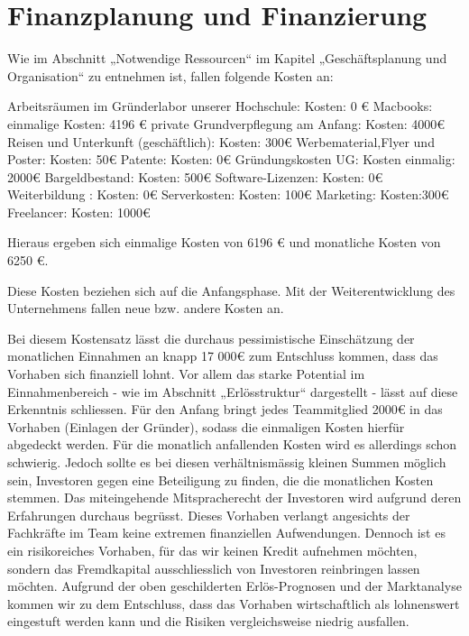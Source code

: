 \chapter{Finanzplanung und Finanzierung}

Wie im Abschnitt „Notwendige Ressourcen“ im Kapitel „Geschäftsplanung und Organisation“ zu entnehmen ist, fallen folgende Kosten an:


Arbeitsräumen im Gründerlabor unserer Hochschule: Kosten: 0 €
Macbooks: einmalige Kosten:  4196 €
private Grundverpflegung am Anfang:  Kosten: 4000€
Reisen und Unterkunft  (geschäftlich):  Kosten: 300€
Werbematerial,Flyer und Poster: Kosten: 50€
Patente: Kosten: 0€
Gründungskosten UG: Kosten einmalig: 2000€
Bargeldbestand: Kosten: 500€
Software-Lizenzen: Kosten: 0€
Weiterbildung : Kosten: 0€
Serverkosten: Kosten: 100€
Marketing: Kosten:300€
Freelancer: Kosten: 1000€

Hieraus ergeben sich einmalige Kosten von 6196 € und monatliche Kosten von 6250 €.

Diese Kosten beziehen sich auf die Anfangsphase. Mit der Weiterentwicklung des Unternehmens fallen neue bzw. andere Kosten an.

Bei diesem Kostensatz lässt die durchaus pessimistische Einschätzung der monatlichen Einnahmen an knapp 17 000€ zum Entschluss kommen, dass das Vorhaben sich finanziell lohnt. Vor allem das starke Potential im Einnahmenbereich - wie im Abschnitt „Erlösstruktur“ dargestellt - lässt auf diese Erkenntnis schliessen.
Für den Anfang bringt jedes Teammitglied 2000€ in das Vorhaben (Einlagen der Gründer), sodass die einmaligen Kosten hierfür abgedeckt werden. Für die monatlich anfallenden Kosten wird es allerdings schon schwierig. Jedoch sollte es bei diesen verhältnismässig kleinen Summen möglich sein, Investoren gegen eine Beteiligung zu finden, die die monatlichen Kosten stemmen. Das miteingehende Mitspracherecht der Investoren wird aufgrund deren Erfahrungen durchaus begrüsst. Dieses Vorhaben verlangt angesichts der Fachkräfte im Team keine extremen finanziellen Aufwendungen. Dennoch ist es ein risikoreiches Vorhaben, für das wir keinen Kredit aufnehmen möchten, sondern das Fremdkapital ausschliesslich von Investoren reinbringen lassen möchten. Aufgrund der oben geschilderten Erlös-Prognosen und der Marktanalyse kommen wir zu dem Entschluss, dass das Vorhaben wirtschaftlich als lohnenswert eingestuft werden kann und die Risiken vergleichsweise niedrig ausfallen.

